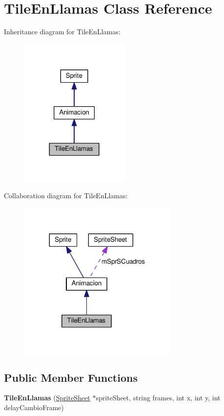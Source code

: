 \hypertarget{class_tile_en_llamas}{}\section{Tile\+En\+Llamas Class Reference}
\label{class_tile_en_llamas}


Inheritance diagram for Tile\+En\+Llamas\+:
\nopagebreak
\begin{figure}[H]
\begin{center}
\leavevmode
\includegraphics[width=156pt]{class_tile_en_llamas__inherit__graph}
\end{center}
\end{figure}


Collaboration diagram for Tile\+En\+Llamas\+:
\nopagebreak
\begin{figure}[H]
\begin{center}
\leavevmode
\includegraphics[width=227pt]{class_tile_en_llamas__coll__graph}
\end{center}
\end{figure}
\subsection*{Public Member Functions}
\begin{DoxyCompactItemize}
\item 
{\bfseries Tile\+En\+Llamas} (\hyperlink{class_sprite_sheet}{Sprite\+Sheet} $\ast$sprite\+Sheet, string frames, int x, int y, int delay\+Cambio\+Frame)\hypertarget{class_tile_en_llamas_aa6985871550253ab2d1e0c4f3f810728}{}\label{class_tile_en_llamas_aa6985871550253ab2d1e0c4f3f810728}

\end{DoxyCompactItemize}
